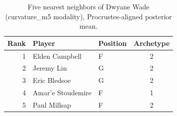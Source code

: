 \begin{table}[htbp]
  \centering\small
  \begin{tabular}{rllc}
    \toprule
    Rank & Player & Position & Archetype \\
    \midrule
    1 & Elden Campbell & F & 2 \\
    2 & Jeremy Lin & G & 2 \\
    3 & Eric Bledsoe & G & 2 \\
    4 & Amar'e Stoudemire & F & 1 \\
    5 & Paul Millsap & F & 2 \\
    \bottomrule
  \end{tabular}
  \caption{Five nearest neighbors of Dwyane Wade (curvature_m5 modality), Procrustes-aligned posterior mean.}
  \label{tab:Dwyane_Wade_neighbors_curvature_m5}
\end{table}

